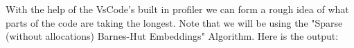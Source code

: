 With the help of the VsCode's built in profiler we can form a rough idea of what parts of the code
are taking the longest. Note that we will be using the "Sparse (without allocations) Barnes-Hut 
Embeddings" Algorithm. Here is the output:
